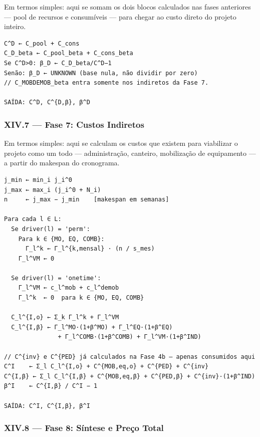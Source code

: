 \documentclass[
  10pt,
]{article}
\begin{document}
Em termos simples: aqui se somam os dois blocos calculados nas fases
anteriores --- pool de recursos e consumíveis --- para chegar ao custo
direto do projeto inteiro.

\begin{verbatim}
C^D ← C_pool + C_cons
C_D_beta ← C_pool_beta + C_cons_beta
Se C^D>0: β_D ← C_D_beta/C^D−1
Senão: β_D ← UNKNOWN (base nula, não dividir por zero)
// C_MOBDEMOB_beta entra somente nos indiretos da Fase 7.

SAÍDA: C^D, C^{D,β}, β^D
\end{verbatim}

\hypertarget{xiv.7-fase-7-custos-indiretos}{%
\subsubsection{XIV.7 --- Fase 7: Custos
Indiretos}\label{xiv.7-fase-7-custos-indiretos}}

Em termos simples: aqui se calculam os custos que existem para
viabilizar o projeto como um todo --- administração, canteiro,
mobilização de equipamento --- a partir do makespan do cronograma.

\begin{verbatim}
j_min ← min_i j_i^0
j_max ← max_i (j_i^0 + N_i)
n     ← j_max − j_min    [makespan em semanas]

Para cada l ∈ L:
  Se driver(l) = 'perm':
    Para k ∈ {MO, EQ, COMB}:
      Γ_l^k ← Γ_l^{k,mensal} · (n / s_mes)
    Γ_l^VM ← 0

  Se driver(l) = 'onetime':
    Γ_l^VM ← c_l^mob + c_l^demob
    Γ_l^k  ← 0  para k ∈ {MO, EQ, COMB}

  C_l^{I,o} ← Σ_k Γ_l^k + Γ_l^VM
  C_l^{I,β} ← Γ_l^MO·(1+β^MO) + Γ_l^EQ·(1+β^EQ)
               + Γ_l^COMB·(1+β^COMB) + Γ_l^VM·(1+β^IND)

// C^{inv} e C^{PED} já calculados na Fase 4b — apenas consumidos aqui
C^I    ← Σ_l C_l^{I,o} + C^{MOB,eq,o} + C^{PED} + C^{inv}
C^{I,β} ← Σ_l C_l^{I,β} + C^{MOB,eq,β} + C^{PED,β} + C^{inv}·(1+β^IND)
β^I    ← C^{I,β} / C^I − 1

SAÍDA: C^I, C^{I,β}, β^I
\end{verbatim}

\hypertarget{xiv.8-fase-8-suxedntese-e-preuxe7o-total}{%
\subsubsection{XIV.8 --- Fase 8: Síntese e Preço
Total}\label{xiv.8-fase-8-suxedntese-e-preuxe7o-total}}
\end{document}
